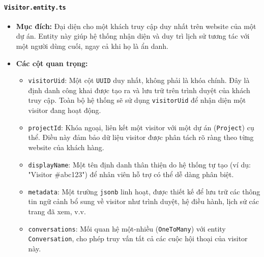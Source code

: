 \paragraph{\texttt{Visitor.entity.ts}}
\begin{itemize}
    \item \textbf{Mục đích:} Đại diện cho một khách truy cập duy nhất trên website của một dự án. Entity này giúp hệ thống nhận diện và duy trì lịch sử tương tác với một người dùng cuối, ngay cả khi họ là ẩn danh.
    \item \textbf{Các cột quan trọng:}
    \begin{itemize}
        \item \texttt{visitorUid}: Một cột \texttt{UUID} duy nhất, không phải là khóa chính. Đây là định danh công khai được tạo ra và lưu trữ trên trình duyệt của khách truy cập. Toàn bộ hệ thống sẽ sử dụng \texttt{visitorUid} để nhận diện một visitor đang hoạt động.
        \item \texttt{projectId}: Khóa ngoại, liên kết một visitor với một dự án (\texttt{Project}) cụ thể. Điều này đảm bảo dữ liệu visitor được phân tách rõ ràng theo từng website của khách hàng.
        \item \texttt{displayName}: Một tên định danh thân thiện do hệ thống tự tạo (ví dụ: "Visitor \#abc123") để nhân viên hỗ trợ có thể dễ dàng phân biệt.
        \item \texttt{metadata}: Một trường \texttt{jsonb} linh hoạt, được thiết kế để lưu trữ các thông tin ngữ cảnh bổ sung về visitor như trình duyệt, hệ điều hành, lịch sử các trang đã xem, v.v.
        \item \texttt{conversations}: Mối quan hệ một-nhiều (\texttt{OneToMany}) với entity \texttt{Conversation}, cho phép truy vấn tất cả các cuộc hội thoại của visitor này.
    \end{itemize}
\end{itemize}
